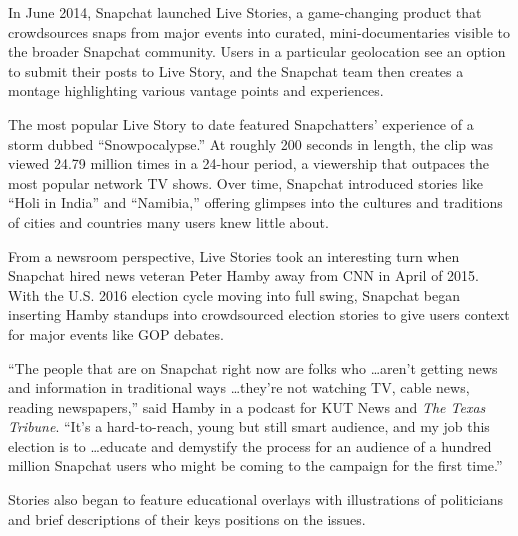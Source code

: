 \documentclass[notoc, symmetric, nobib, nols]{towcenter-guideto-book}
\begin{document}
In June 2014, Snapchat launched Live Stories, a game-changing product that crowdsources snaps from major events into curated, mini-documentaries visible to the broader Snapchat community. Users in a particular geolocation see an option to submit their posts to Live Story, and the Snapchat team then creates a montage highlighting various vantage points and experiences.

The most popular Live Story to date featured Snapchatters' experience of a storm dubbed ``Snowpocalypse.'' At roughly 200 seconds in length, the clip was viewed 24.79 million times in a 24-hour period, a viewership that outpaces the most popular network TV shows. Over time, Snapchat introduced stories like ``Holi in India'' and ``Namibia,'' offering glimpses into the cultures and traditions of cities and countries many users knew little about.  

From a newsroom perspective, Live Stories took an interesting turn when Snapchat hired news veteran Peter Hamby away from CNN in April of 2015. With the U.S. 2016 election cycle moving into full swing, Snapchat began inserting Hamby standups into crowdsourced election stories to give users context for major events like GOP debates.  


``The people that are on Snapchat right now are folks who \ldots aren't getting news and information in traditional ways \ldots they're not watching TV, cable news, reading newspapers,'' said Hamby in a podcast for KUT News and \textit{The Texas Tribune}. ``It's a hard-to-reach, young but still smart audience, and my job this election is to \ldots educate and demystify the process for an audience of a hundred million Snapchat users who might be coming to the campaign for the first time.''\autocite{KUTSnapchatElection} 


Stories also began to feature educational overlays with illustrations of politicians and brief descriptions of their keys positions on the issues.  



\end{document}
